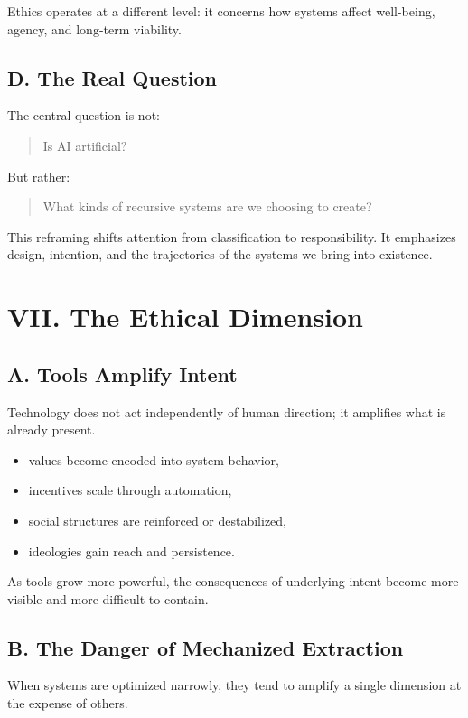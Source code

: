 \documentclass[12pt]{article}
\begin{document}
Ethics operates at a different level: it concerns how systems affect well-being, agency, and long-term viability.

\subsection*{D. The Real Question}

The central question is not:
\begin{quote}
Is AI artificial?
\end{quote}

But rather:
\begin{quote}
What kinds of recursive systems are we choosing to create?
\end{quote}

This reframing shifts attention from classification to responsibility. It emphasizes design, intention, and the trajectories of the systems we bring into existence.

\section*{VII. The Ethical Dimension}

\subsection*{A. Tools Amplify Intent}

Technology does not act independently of human direction; it amplifies what is already present.

\begin{itemize}
    \item values become encoded into system behavior,
    \item incentives scale through automation,
    \item social structures are reinforced or destabilized,
    \item ideologies gain reach and persistence.
\end{itemize}

As tools grow more powerful, the consequences of underlying intent become more visible and more difficult to contain.

\subsection*{B. The Danger of Mechanized Extraction}

When systems are optimized narrowly, they tend to amplify a single dimension at the expense of others.
\end{document}
